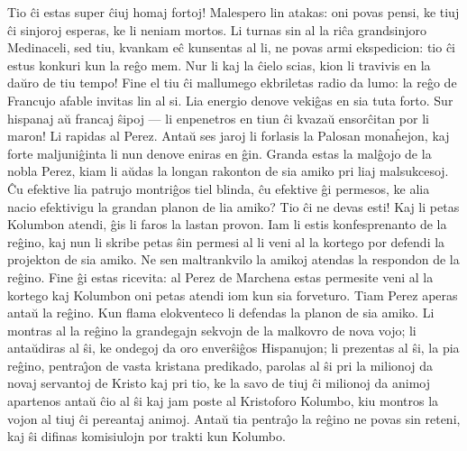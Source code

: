    Tio \^ci estas super \^ciuj homaj fortoj! Malespero lin atakas: oni
povas pensi, ke tiuj \^ci sinjoroj esperas, ke li neniam mortos. Li
turnas sin al la ri\^ca grandsinjoro Medinaceli, sed tiu, kvankam
e\^c kunsentas al li, ne povas armi ekspedicion: tio \^ci estus
konkuri kun la re\^go mem. Nur li kaj la \^cielo scias, kion li
travivis en la da\u uro de tiu tempo! Fine el tiu \^ci mallumego
ekbriletas radio da lumo: la re\^go de Francujo afable invitas lin
al si. Lia energio denove veki\^gas en sia tuta forto. Sur hispanaj
a\u u francaj \^sipoj --- li enpenetros en tiun \^ci kvaza\u u
ensor\^citan por li maron! Li rapidas al Perez. Anta\u u ses jaroj
li forlasis la Palosan mona\^hejon, kaj forte maljuni\^ginta li nun
denove eniras en \^gin. Granda estas la mal\^gojo de la nobla Perez,
kiam li a\u udas la longan rakonton de sia amiko pri liaj
malsukcesoj. \^Cu efektive lia patrujo montri\^gos tiel blinda, \^cu
efektive \^gi permesos, ke alia nacio efektivigu la grandan planon
de lia amiko? Tio \^ci ne devas esti! Kaj li petas Kolumbon atendi,
\^gis li faros la lastan provon. Iam li estis konfesprenanto de la
re\^gino, kaj nun li skribe petas \^sin permesi al li veni al la
kortego por defendi la projekton de sia amiko. Ne sen maltrankvilo
la amikoj atendas la respondon de la re\^gino. Fine \^gi estas
ricevita: al Perez de Marchena estas permesite veni al la kortego
kaj Kolumbon oni petas atendi iom kun sia forveturo. Tiam Perez
aperas anta\u u la re\^gino. Kun flama elokventeco li defendas la
planon de sia amiko. Li montras al la re\^gino la grandegajn sekvojn
de la malkovro de nova vojo; li anta\u udiras al \^si, ke ondegoj da
oro enver\^si\^gos Hispanujon; li prezentas al \^si, la pia
re\^gino, pentra\^{\j}on de vasta kristana predikado, parolas al
\^si pri la milionoj da novaj servantoj de Kristo kaj pri tio, ke la
savo de tiuj \^ci milionoj da animoj apartenos anta\u u \^cio al
\^si kaj jam poste al Kristoforo Kolumbo, kiu montros la vojon al
tiuj \^ci pereantaj animoj. Anta\u u tia pentra\^{\j}o la re\^gino
ne povas sin reteni, kaj \^si difinas komisiulojn por trakti kun
Kolumbo.

